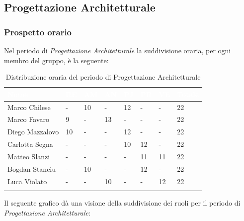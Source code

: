 \newpage
\subsection{Progettazione Architetturale}
\label{PPA}
\subsubsection{Prospetto orario}

Nel periodo di \textit{Progettazione Architetturale} la suddivisione oraria, per ogni membro del gruppo, è la seguente:


\begin{longtable}{|C{.30\textwidth}|C{.06\textwidth}|C{.06\textwidth}|C{.06\textwidth} | C{.06\textwidth}| C{.06\textwidth} | C{.06\textwidth} | C{.10\textwidth} |}
\hline
{}	\textbf{\textcolor{white}{Nome}} & \textbf{\textcolor{white}{RE}} & \textbf{\textcolor{white}{AM}} & \textbf{\textcolor{white}{AN}} & \textbf{\textcolor{white}{PJ}} & \textbf{\textcolor{white}{PR}} & \textbf{\textcolor{white}{VE}} & \textbf{\textcolor{white}{Totale}}\\
\hline 
Marco Chilese & - & 10 & - & 12 & - & - & 22 \\
\hline
{}Marco Favaro & 9 & - & 13 & - & - & - & 22 \\
\hline
Diego Mazzalovo & 10 & - & - & 12 & - & - & 22 \\ 
\hline
{}Carlotta Segna & - & - & - & 10 & 12 & - & 22 \\
\hline
Matteo Slanzi & - & - & - & - & 11 & 11 & 22 \\
\hline
{}Bogdan Stanciu & - & 10 & - & - & 12 & - & 22 \\
\hline
Luca Violato & - & - & 10 & - & - & 12 & 22 \\
\hline 

\caption{Distribuzione oraria del periodo di Progettazione Architetturale}
\label{Distribuzione oraria del periodo di pa}
\end{longtable}

Il seguente grafico dà una visione della suddivisione dei ruoli per il periodo di \textit{Progettazione Architetturale}:

